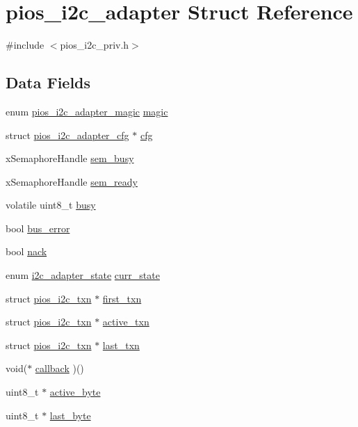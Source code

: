 \hypertarget{structpios__i2c__adapter}{\section{pios\-\_\-i2c\-\_\-adapter \-Struct \-Reference}
\label{structpios__i2c__adapter}
}


{\ttfamily \#include $<$pios\-\_\-i2c\-\_\-priv.\-h$>$}

\subsection*{\-Data \-Fields}
\begin{DoxyCompactItemize}
\item 
enum \hyperlink{pios__i2c__priv_8h_af5ae4a1b83b5404462787136ee41be24}{pios\-\_\-i2c\-\_\-adapter\-\_\-magic} \hyperlink{structpios__i2c__adapter_a07891f689e89b36732affa16c1c3bf94}{magic}
\item 
struct \hyperlink{structpios__i2c__adapter__cfg}{pios\-\_\-i2c\-\_\-adapter\-\_\-cfg} $\ast$ \hyperlink{structpios__i2c__adapter_a99a6a40ff53546cd3f5a316a621be402}{cfg}
\item 
x\-Semaphore\-Handle \hyperlink{structpios__i2c__adapter_ae21b610793f476b61cedafa82fffc493}{sem\-\_\-busy}
\item 
x\-Semaphore\-Handle \hyperlink{structpios__i2c__adapter_a8a95bc22396c17869efa5a587a1bd5dc}{sem\-\_\-ready}
\item 
volatile uint8\-\_\-t \hyperlink{structpios__i2c__adapter_a25823130023ae773a53a858647b65fbb}{busy}
\item 
bool \hyperlink{structpios__i2c__adapter_a98b74dc40da65289c18494530b759724}{bus\-\_\-error}
\item 
bool \hyperlink{structpios__i2c__adapter_a22998be1ea282fe23fcd44c2b559c987}{nack}
\item 
enum \hyperlink{pios__i2c__priv_8h_ac73b69ffe53544057fa2e4751fd9c22b}{i2c\-\_\-adapter\-\_\-state} \hyperlink{structpios__i2c__adapter_ac619064c9dc42d3057f2188f188d5ee3}{curr\-\_\-state}
\item 
struct \hyperlink{structpios__i2c__txn}{pios\-\_\-i2c\-\_\-txn} $\ast$ \hyperlink{structpios__i2c__adapter_ad98b03cc641fe33909c19a8e96cb64d5}{first\-\_\-txn}
\item 
struct \hyperlink{structpios__i2c__txn}{pios\-\_\-i2c\-\_\-txn} $\ast$ \hyperlink{structpios__i2c__adapter_a9f7ec0aa23437d00ceade3b67625eec6}{active\-\_\-txn}
\item 
struct \hyperlink{structpios__i2c__txn}{pios\-\_\-i2c\-\_\-txn} $\ast$ \hyperlink{structpios__i2c__adapter_af283735c4934e46748f2461bf338811e}{last\-\_\-txn}
\item 
void($\ast$ \hyperlink{structpios__i2c__adapter_abe4e844b2ffcd0984dc55c8985bd0401}{callback} )()
\item 
uint8\-\_\-t $\ast$ \hyperlink{structpios__i2c__adapter_a841cb6403bc7fc1cde74b36755789d03}{active\-\_\-byte}
\item 
uint8\-\_\-t $\ast$ \hyperlink{structpios__i2c__adapter_a09797c133013f2126da829410d1df0c0}{last\-\_\-byte}
\end{DoxyCompactItemize}


